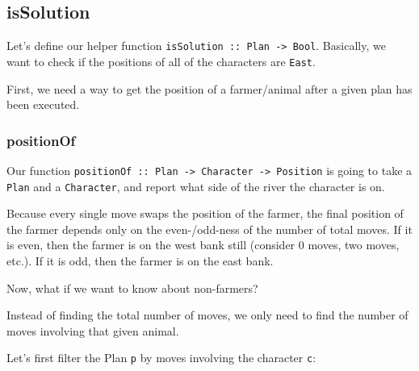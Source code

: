 \documentclass[]{article}
\newenvironment{Shaded}{}{}
\newcommand{\KeywordTok}[1]{\textcolor[rgb]{0.00,0.44,0.13}{\textbf{{#1}}}}
\newcommand{\DataTypeTok}[1]{\textcolor[rgb]{0.56,0.13,0.00}{{#1}}}
\newcommand{\OtherTok}[1]{\textcolor[rgb]{0.00,0.44,0.13}{{#1}}}
\newcommand{\FunctionTok}[1]{\textcolor[rgb]{0.02,0.16,0.49}{{#1}}}
\newcommand{\NormalTok}[1]{{#1}}
\begin{document}
\subsection{isSolution}\label{issolution}

Let's define our helper function
\texttt{isSolution\ ::\ Plan\ -\textgreater{}\ Bool}. Basically, we want to
check if the positions of all of the characters are \texttt{East}.

First, we need a way to get the position of a farmer/animal after a given plan
has been executed.

\subsubsection{positionOf}\label{positionof}

Our function
\texttt{positionOf\ ::\ Plan\ -\textgreater{}\ Character\ -\textgreater{}\ Position}
is going to take a \texttt{Plan} and a \texttt{Character}, and report what side
of the river the character is on.

Because every single move swaps the position of the farmer, the final position
of the farmer depends only on the even-/odd-ness of the number of total moves.
If it is even, then the farmer is on the west bank still (consider 0 moves, two
moves, etc.). If it is odd, then the farmer is on the east bank.

\begin{Shaded}
\end{Shaded}

Now, what if we want to know about non-farmers?

Instead of finding the total number of moves, we only need to find the number of
moves involving that given animal.

Let's first filter the Plan \texttt{p} by moves involving the character
\texttt{c}:
\end{document}

